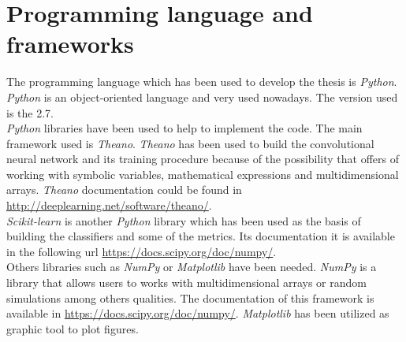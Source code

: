 \section{Programming language and frameworks}
The  programming language which has been used to develop the thesis is \textit{Python}. \textit{Python} is an object-oriented language and very used nowadays. The version used is the 2.7.\\

\textit{Python} libraries have been used to help to implement the code. The main framework used is \textit{Theano}. \textit{Theano} has been used to build the convolutional neural network and its training procedure because of the possibility that offers of working with symbolic variables, mathematical expressions and multidimensional arrays. \textit{Theano} documentation could be found in \url{http://deeplearning.net/software/theano/}.\\

\textit{Scikit-learn} is another \textit{Python} library which has been used as the basis of building the classifiers and some of the metrics. Its documentation it is available in the following url \url{https://docs.scipy.org/doc/numpy/}.\\

Others libraries such as \textit{NumPy} or \textit{Matplotlib} have been needed. \textit{NumPy} is a library that allows users to works with multidimensional arrays or random simulations among others qualities. The documentation of this framework is available in \url{https://docs.scipy.org/doc/numpy/}. \textit{Matplotlib} has been utilized as graphic tool to plot figures.\\
